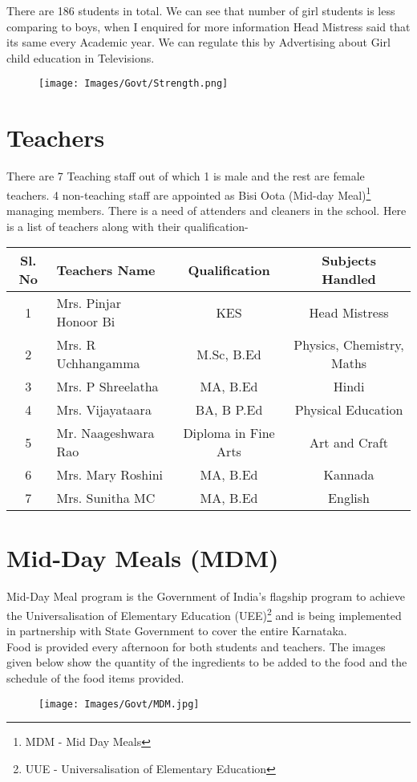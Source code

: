 There are 186 students in total. We can see that number of girl students is less comparing to boys, when I enquired for more information Head Mistress said that its same every Academic year. We can regulate this by Advertising about Girl child education in Televisions.

\begin{figure}[H]
    \centering
    \texttt{[image: Images/Govt/Strength.png]}
\end{figure}

\section{Teachers}
There are 7 Teaching staff out of which 1 is male and the rest are female teachers. 4 non-teaching staff are appointed as Bisi Oota (Mid-day Meal)\footnote{MDM - Mid Day Meals} managing members. There is a need of attenders and cleaners in the school. Here is a list of teachers along with their qualification-

\begin{table}[H]
    \centering
    \begin{tabular}{|c|l|c|c|} \hline
        \textbf{Sl. No} & \textbf{Teachers Name} & \textbf{Qualification} & \textbf{Subjects Handled} \\ \hline 
        1 & Mrs. Pinjar Honoor Bi & KES & Head Mistress \\ \hline 
        2 & Mrs. R Uchhangamma & M.Sc, B.Ed & Physics, Chemistry, Maths\\ \hline 
        3 & Mrs. P Shreelatha & MA, B.Ed & Hindi\\ \hline
        4 & Mrs. Vijayataara & BA, B P.Ed & Physical Education\\ \hline
        5 & Mr. Naageshwara Rao & Diploma in Fine Arts & Art and Craft\\ \hline
        6 & Mrs. Mary Roshini & MA, B.Ed & Kannada \\ \hline
        7 & Mrs. Sunitha MC & MA, B.Ed & English \\ \hline
    \end{tabular}
\end{table}

\section{Mid-Day Meals (MDM)}
Mid-Day Meal program is the Government of India's flagship program to achieve the Universalisation of Elementary Education (UEE)\footnote{UUE - Universalisation of Elementary Education} and is being implemented in partnership with State Government to cover the entire Karnataka. \\
Food is provided every afternoon for both students and teachers. The images given below show the quantity of the ingredients to be added to the food and the schedule of the food items provided.
\begin{figure}[H]
    \centering
    \texttt{[image: Images/Govt/MDM.jpg]}
\end{figure}

